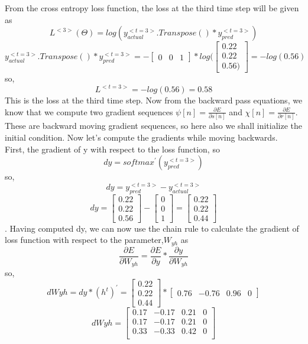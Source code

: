 \documentclass[12pt,letterpaper]{article}
\begin{document}
From the cross entropy loss function, the loss at the third time step will be given as
\[
L^{<3>}(\Theta)=log(y_{actual}^{<t=3>}.Transpose()*y_{pred}^{<t=3>})
\]
\[
y_{actual}^{<t=3>}.Transpose()*y_{pred}^{<t=3>} = -\begin{bmatrix}
0&0&1
\end{bmatrix}*log(\begin{bmatrix}
0.22\\
0.22\\
0.56)
\end{bmatrix} = -log(0.56)
\]
so,
\[
L^{<t=3>} = -log(0.56) = 0.58
\]
This is the loss at the third time step.
Now from the backward pass equations, we know that we compute two gradient sequences $\psi[n] = \frac{\partial{E}}{\partial{s[n]}}$ and $\chi[n] = \frac{\partial{E}}{\partial{r[n]}}$. 
These are backward moving gradient sequences, so here also we shall initialize the initial condition. 
Now let's compute the gradients while moving backwards.\\
First, the gradient of y with respect to the loss function, so
\[
dy = softmax^{'}(y_{pred}^{<t=3>})
\]
so,
\[
dy = y_{pred}^{<t=3>}-y_{actual}^{<t=3>}
\]
\[
dy = \begin{bmatrix}
0.22\\
0.22\\
0.56
\end{bmatrix} - \begin{bmatrix}
0\\0\\1
\end{bmatrix} = \begin{bmatrix}
0.22\\0.22\\0.44
\end{bmatrix}
\].
Having computed dy, we can now use the chain rule to calculate the gradient of loss function with respect to the parameter,$W_{yh}$ as
\[
\frac{\partial{E}}{\partial{W_{yh}}} = \frac{\partial{E}}{\partial{y}}*\frac{\partial{y}}{\partial{
W_{yh}}}
\]
so,
\[
dWyh = dy*(h^{t})^{'} =  \begin{bmatrix}
0.22\\0.22\\0.44
\end{bmatrix}*\begin{bmatrix}
0.76&-0.76&0.96&0
\end{bmatrix} 
\]
\[
dWyh = \begin{bmatrix}
0.17&	-0.17&	0.21&	0\\
0.17	&-0.17	&0.21&	0\\
0.33&	-0.33&	0.42&	0\\
\end{bmatrix}
\]
\end{document}
